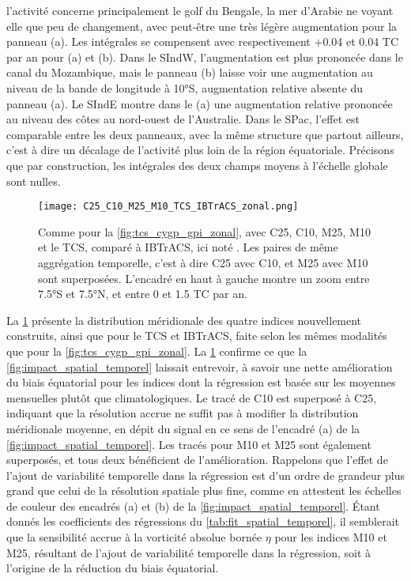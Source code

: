 \documentclass[../main.tex]{subfiles}
\begin{document}
l'activité concerne principalement le golf du Bengale, la mer d'Arabie ne voyant elle que peu de changement, avec peut-être une très légère augmentation pour la
panneau (a). Les intégrales se compensent avec respectivement $+$\num{0.04} et \num{0.04} TC par an pour (a) et (b). Dans le SIndW, l'augmentation est plus
prononcée dans le canal du Mozambique, mais le panneau (b) laisse voir une augmentation au niveau de la bande de longitude à \ang{10}S, augmentation relative
absente du panneau (a). Le SIndE montre dans le (a) une augmentation relative prononcée au niveau des côtes au nord-ouest de l'Australie. Dans le SPac, l'effet
est comparable entre les deux panneaux, avec la même structure que partout ailleurs, c'est à dire un décalage de l'activité plus loin de la région équatoriale.
Précisons que par construction, les intégrales des deux champs moyens à l'échelle globale sont nulles.

\begin{figure}[htb]
    \centering
    \texttt{[image: C25\_C10\_M25\_M10\_TCS\_IBTrACS\_zonal.png]}
    \caption{Comme pour la \cref{fig:tcs_cygp_gpi_zonal}, avec C25, C10, M25, M10 et le TCS, comparé à IBTrACS, ici noté . Les paires de même
    aggrégation temporelle, c'est à dire C25 avec C10, et M25 avec M10 sont superposées. L'encadré en haut à gauche montre un zoom entre \ang{7.5}S et
    \ang{7.5}N, et entre 0 et \num{1.5} TC par an.}
    \label{fig:my_fit_meridional}
\end{figure}

La \cref{fig:my_fit_meridional} présente la distribution méridionale des quatre indices nouvellement construits, ainsi que pour le TCS et IBTrACS, faite selon
les mêmes modalités que pour la \cref{fig:tcs_cygp_gpi_zonal}. La \cref{fig:my_fit_meridional} confirme ce que la \cref{fig:impact_spatial_temporel} laissait
entrevoir, à savoir une nette amélioration du biais équatorial pour les indices dont la régression est basée sur les moyennes mensuelles plutôt que
climatologiques. Le tracé de C10 est superposé à C25, indiquant que la résolution accrue ne suffit pas à modifier la distribution méridionale moyenne, en dépit
du signal en ce sens de l'encadré (a) de la \cref{fig:impact_spatial_temporel}. Les tracés pour M10 et M25 sont également superposés, et tous deux bénéficient
de l'amélioration. Rappelons que l'effet de l'ajout de variabilité temporelle dans la régression est d'un ordre de grandeur plus grand que celui de la
résolution spatiale plus fine, comme en attestent les échelles de couleur des encadrés (a) et (b) de la \cref{fig:impact_spatial_temporel}. Étant donnés les
coefficients des régressions du \cref{tab:fit_spatial_temporel}, il semblerait que la sensibilité accrue à la vorticité absolue bornée $\eta$ pour les indices
M10 et M25, résultant de l'ajout de variabilité temporelle dans la régression, soit à l'origine de la réduction du biais équatorial.
\end{document}
